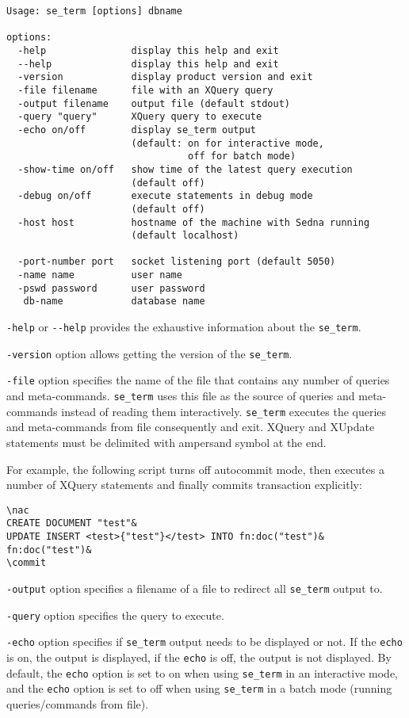 \documentclass[a4paper,12pt]{article}
\begin{document}
\small{
\begin{verbatim}
Usage: se_term [options] dbname

options:
  -help               display this help and exit
  --help              display this help and exit
  -version            display product version and exit
  -file filename      file with an XQuery query
  -output filename    output file (default stdout)
  -query "query"      XQuery query to execute
  -echo on/off        display se_term output 
                      (default: on for interactive mode,
                                off for batch mode)
  -show-time on/off   show time of the latest query execution
                      (default off)
  -debug on/off       execute statements in debug mode
                      (default off)
  -host host          hostname of the machine with Sedna running
                      (default localhost)

  -port-number port   socket listening port (default 5050)
  -name name          user name
  -pswd password      user password
   db-name            database name
\end{verbatim}}

\verb!-help! or \verb!--help! provides the exhaustive information about the
\verb!se_term!.

\verb!-version! option allows getting the version of the \verb!se_term!.

\verb!-file! option specifies the name of the file that contains any number of
queries and meta-commands. \verb!se_term! uses this file as the source of
queries and meta-commands instead of reading them interactively. \verb!se_term!
executes the queries and meta-commands from file consequently and exit. XQuery
and XUpdate statements must be delimited with ampersand symbol at the end.

For example, the following script turns off autocommit mode, then executes a
number of XQuery statements and finally commits transaction explicitly:

\small{
\begin{verbatim}
\nac
CREATE DOCUMENT "test"&
UPDATE INSERT <test>{"test"}</test> INTO fn:doc("test")&
fn:doc("test")&
\commit
\end{verbatim}}

\verb!-output! option specifies a filename of a file to redirect all
\verb!se_term! output to.

\verb!-query! option specifies the query to execute.

\verb!-echo! option specifies if \verb!se_term! output needs to be displayed or
not. If the \verb!echo! is on, the output is displayed, if the \verb!echo! is
off, the output is not displayed. By default, the \verb!echo! option is set to
on when using \verb!se_term! in an interactive mode, and the \verb!echo! option
is set to off when using \verb!se_term! in a batch mode (running
queries/commands from file).
\end{document}
